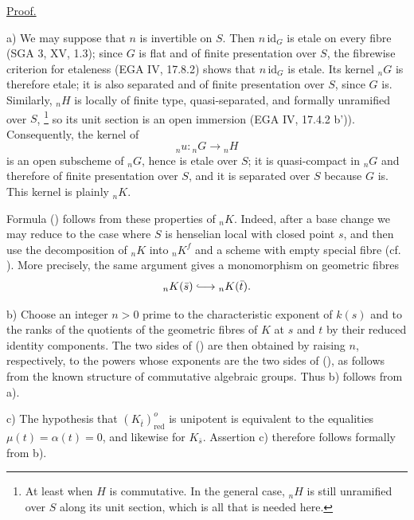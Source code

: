 \medskip
\noindent
\underline{Proof.}

\smallskip
\noindent
a) We may suppose that $n$ is invertible on $S$.  Then $n\,\mathrm{id}_G$
is etale on every fibre (SGA 3, XV, 1.3); since $G$ is flat and of finite
presentation over $S$, the fibrewise criterion for etaleness (EGA IV,
17.8.2) shows that $n\,\mathrm{id}_G$ is etale.  Its kernel ${}_nG$ is
therefore etale; it is also separated and of finite presentation over $S$,
since $G$ is.  Similarly, ${}_nH$ is locally of finite type,
quasi-separated, and formally unramified over $S$,
\footnote{At least when $H$ is commutative.  In the general case, ${}_nH$
is still unramified over $S$ along its unit section, which is all that is
needed here.}
so its unit section is an open immersion (EGA IV, 17.4.2 b')).  Consequently,
the kernel of
\[
 {}_nu:{}_nG\longrightarrow {}_nH
\]
is an open subscheme of ${}_nG$, hence is etale over $S$; it is
quasi-compact in ${}_nG$ and therefore of finite presentation over $S$, and
it is separated over $S$ because $G$ is.  This kernel is plainly ${}_nK$.

Formula () follows from these properties of ${}_nK$.  Indeed, after a
base change we may reduce to the case where $S$ is henselian local with
closed point $s$, and then use the decomposition of ${}_nK$ into
${}_nK^f$ and a scheme with empty special fibre (cf. ).  More precisely,
the same argument gives a monomorphism on geometric fibres
\[
 {}_nK(\bar s)\lhook\joinrel\longrightarrow {}_nK(\bar t).
\]

\smallskip
\noindent
b) Choose an integer $n>0$ prime to the characteristic exponent of $k(s)$
and to the ranks of the quotients of the geometric fibres of $K$ at $s$ and
$t$ by their reduced identity components.  The two sides of () are
then obtained by raising $n$, respectively, to the powers whose exponents
are the two sides of (), as follows from the known structure of
commutative algebraic groups.  Thus b) follows from a).

\smallskip
\noindent
c) The hypothesis that $(K_{\bar t})^o_{\mathrm{red}}$ is unipotent is
equivalent to the equalities $\mu(t)=\alpha(t)=0$, and likewise for
$K_{\bar s}$.  Assertion c) therefore follows formally from b).


